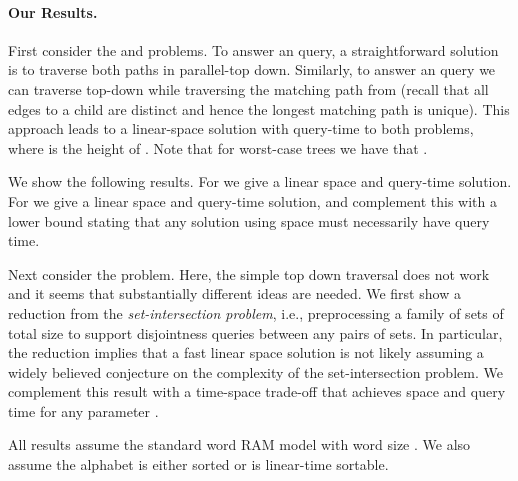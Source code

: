 \documentclass [10pt]{article}
\begin{document}
\paragraph{\bf Our Results.}
First consider the  and  problems. To answer an  query, a straightforward solution is to traverse both paths in parallel-top down. Similarly, to answer an  query we can traverse   top-down while traversing the matching path from  (recall that all edges to a child are distinct and hence the longest matching path is unique). This approach leads to a linear-space  solution with  query-time  to both problems, where  is the height of . Note that for worst-case trees we have that . 

We show the following results. For  we give a linear  space and  query-time solution. For    we give a linear   space and  query-time solution, and complement this with a lower bound stating that any   solution using  space must necessarily
have  query time.
 


Next consider the  problem. Here, the simple top down traversal does not  work and it seems that substantially different ideas are needed. We first show a reduction from the \emph{set-intersection problem}, i.e., preprocessing a family of sets of total size  to support disjointness queries between any pairs of sets. In particular, the reduction implies that a fast linear space solution is not likely assuming a widely believed conjecture on the complexity of the set-intersection problem. We complement this result with a time-space trade-off that achieves  space and  query time for any parameter .


All results assume the standard word RAM model with word size . We also assume the alphabet is either sorted or is linear-time sortable.
\end{document}
